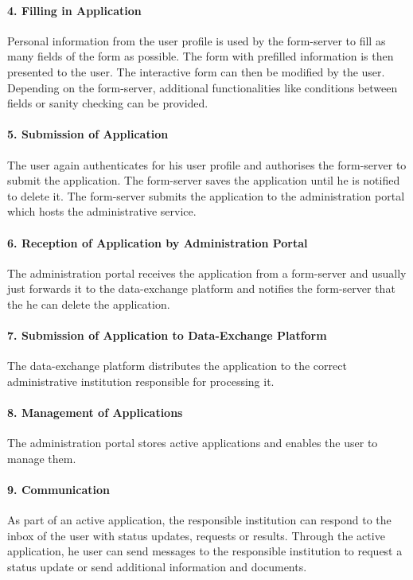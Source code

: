 \documentclass[
     12pt,         %
     a4paper,      %
     BCOR=10mm,version=first,     %
     DIV=14,version=first,        %
     ]{scrreprt}
\begin{document}
\paragraph{4. Filling in Application}
Personal information from the user profile is used by the form-server to fill as many fields of the form as possible. The form with prefilled information is then presented to the user. The interactive form can then be modified by the user. Depending on the form-server, additional functionalities like conditions between fields or sanity checking can be provided.

\paragraph{5. Submission of Application}
The user again authenticates for his user profile and authorises the form-server to submit the application. The form-server saves the application until he is notified to delete it. The form-server submits the application to the administration portal which hosts the administrative service.

\paragraph{6. Reception of Application by Administration Portal}
The administration portal receives the application from a form-server and usually just forwards it to the data-exchange platform and notifies the form-server that the he can delete the application.

\paragraph{7. Submission of Application to Data-Exchange Platform}
The data-exchange platform distributes the application to the correct administrative institution responsible for processing it.

\paragraph{8. Management of Applications}
The administration portal stores active applications and enables the user to manage them.

\paragraph{9. Communication}
As part of an active application, the responsible institution can respond to the inbox of the user with status updates, requests or results.  Through the active application, he user can send messages to the responsible institution to request a status update or send additional information and documents.
\end{document}
